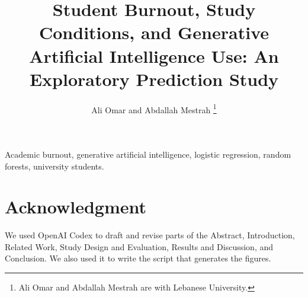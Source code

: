 \documentclass{IEEEtran}
\title{Student Burnout, Study Conditions, and Generative Artificial Intelligence Use: An Exploratory Prediction Study}
\author{Ali Omar and Abdallah Mestrah%
\thanks{Ali Omar and Abdallah Mestrah are with Lebanese University.}}
\begin{document}
\maketitle



\begin{IEEEkeywords}
Academic burnout, generative artificial intelligence, logistic regression, random forests, university students.
\end{IEEEkeywords}







\section*{Acknowledgment}
We used OpenAI Codex to draft and revise parts of the Abstract, Introduction, Related Work, Study Design and Evaluation, Results and Discussion, and Conclusion. We also used it to write the script that generates the figures.



\end{document}
